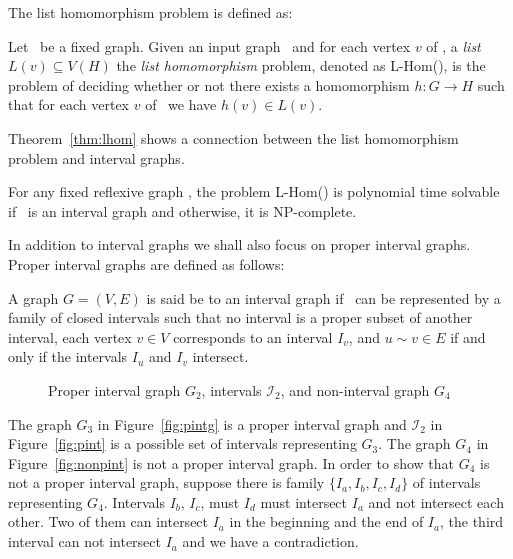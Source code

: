 The list homomorphism problem is defined as:

\begin{defi} [L-Hom]
Let \mH\ be a fixed graph. Given an input graph \mG\ and for each vertex \(v\) of \mG,
a \emph{list} \(L(v) \subseteq V(H)\) the \emph{list homomorphism} problem, denoted
as L-Hom(\mH), is the problem of  deciding whether or not
there exists a homomorphism \(h: G\to H\) such that for each vertex \(v\) of \mG\ 
we have \(h(v)\in L(v)\)\@.
\end{defi}

Theorem~\ref{thm:lhom} shows a connection between the list homomorphism
problem and interval graphs.

\begin{theorem} [Feder and Hell 1996 \cite{listhom}] \label{thm:lhom}
For any fixed reflexive graph \mH, the problem L-Hom(\mH) is polynomial time solvable if
\mH\ is an interval graph and otherwise, it is NP-complete.
\end{theorem}

In addition to interval graphs we shall also focus on proper interval graphs.
Proper interval graphs are defined as follows:

\begin{defi}
A graph \(G=(V,E)\) is said be to an interval graph if \mG\ can
be represented by a family of closed intervals such that
no interval is a proper subset of another interval,
each vertex \(v \in V\) corresponds to an interval \(I_v\), and \(u \sim v \in E\)
if and only if the intervals \(I_u\) and \(I_v\) intersect.
\end{defi}

\begin{figure}[h]
\hspace{1cm}
\subfigure[\ensuremath{G_3}]{\label{fig:pintg}}\hspace{2cm}
\subfigure[\ensuremath{I_2}]{\label{fig:pint}}\hspace{2cm}
\subfigure[\ensuremath{G_4}]{\label{fig:nonpint}}
\caption{Proper interval graph \ensuremath{G_2}, intervals \ensuremath{\mathcal{I}_2}, and non-interval graph \ensuremath{G_4}}\label{fig:pintgi}
\end{figure}

The graph \(G_3\) in Figure~\ref{fig:pintg} is a proper interval graph and
\(\mathcal{I}_2\) in Figure~\ref{fig:pint} is a possible set of intervals representing \(G_3\)\@.
The graph \(G_4\) in Figure~\ref{fig:nonpint} is not a proper interval graph. In order to show that
\(G_4\) is not a proper interval graph, suppose there is family \(\{I_a, I_b, I_c, I_d\}\) of intervals representing \(G_4\)\@.
Intervals \(I_b\), \(I_c\), must \(I_d\) must intersect \(I_a\) and not intersect each other. Two of them can intersect \(I_a\)
in the beginning and the end of \(I_a\), the third interval can not intersect \(I_a\) and we have a contradiction.

